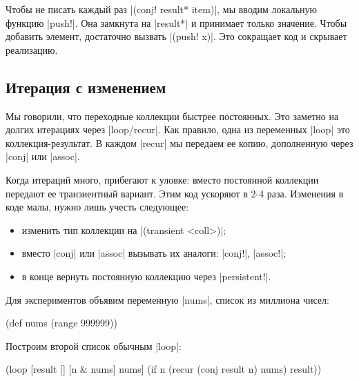 Чтобы не писать каждый раз \spverb|(conj! result* item)|, мы
вводим локальную функцию \spverb|push!|. Она замкнута на \spverb|result*| и
принимает только значение. Чтобы добавить элемент, достаточно вызвать
\spverb|(push! x)|. Это сокращает код и скрывает реализацию.

\subsection{Итерация с изменением}

Мы говорили, что переходные коллекции быстрее постоянных. Это заметно на долгих
итерациях через \spverb|loop/recur|. Как правило, одна из переменных
\spverb|loop| это коллекция-результат. В каждом \spverb|recur| мы передаем ее
копию, дополненную через \spverb|conj| или \spverb|assoc|.


Когда итераций много, прибегают к уловке: вместо постоянной коллекции передают
ее транзиентный вариант. Этим код ускоряют в 2-4 раза. Изменения в коде малы,
нужно лишь учесть следующее:

\begin{itemize}

\item
  изменить тип коллекции на \spverb|(transient <coll>)|;

\item
  вместо \spverb|conj| или \spverb|assoc| вызывать их аналоги: \spverb|conj!|,
  \spverb|assoc!|;

\item
  в конце вернуть постоянную коллекцию через \spverb|persistent!|.

\end{itemize}

Для экспериментов объявим переменную \spverb|nums|, список из миллиона чисел:

\begin{english}
  \begin{clojure}
(def nums (range 999999))
  \end{clojure}
\end{english}

\noindent
Построим второй список обычным \spverb|loop|:

\begin{english}
  \begin{clojure}
(loop [result []
       [n & nums] nums]
  (if n
    (recur (conj result n) nums)
    result))
  \end{clojure}
\end{english}


